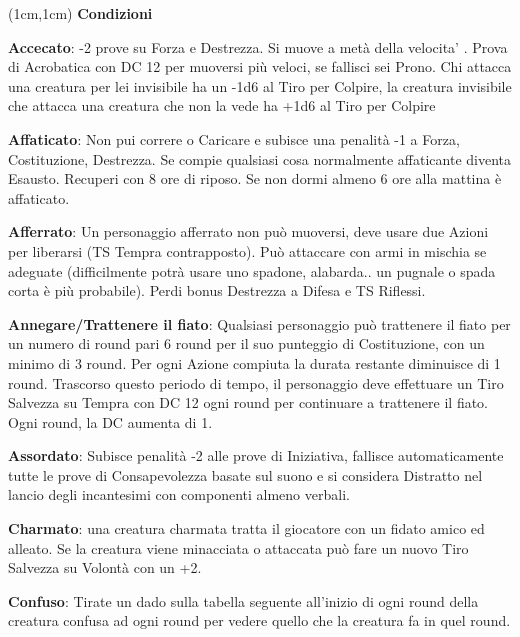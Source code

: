 \documentclass[a4paper,12 pt,openany]{book}
\begin{document}
	\center

	\begin{textblock*}{19 cm}(1cm,1cm) %
		\flushleft
		\textbf{Condizioni}\\
		\footnotesize

		\begin{multicols}{2}

\textbf{Accecato}: -2 prove su Forza e Destrezza.
Si muove a metà della velocita' . Prova di Acrobatica con DC 12 per muoversi più veloci, se fallisci sei Prono.
Chi attacca una creatura per lei invisibile ha un -1d6 al Tiro per Colpire, la creatura invisibile che attacca una creatura che non la vede ha +1d6 al Tiro per Colpire

\textbf{Affaticato}: Non pui correre o Caricare e subisce una penalità -1 a Forza, Costituzione, Destrezza. Se compie qualsiasi cosa normalmente affaticante diventa Esausto.
Recuperi con 8 ore di riposo. Se non dormi almeno 6 ore alla mattina è affaticato.

\textbf{Afferrato}: Un personaggio afferrato non può muoversi, deve usare due Azioni per liberarsi (TS Tempra contrapposto). Può attaccare con armi in mischia se adeguate (difficilmente potrà usare uno spadone, alabarda.. un pugnale o spada corta è più probabile). Perdi bonus Destrezza a Difesa e TS Riflessi.

\textbf{Annegare/Trattenere il fiato}:  Qualsiasi personaggio può trattenere il fiato per un numero di round pari 6 round per il suo punteggio di Costituzione, con un minimo di 3 round. Per ogni Azione compiuta la durata restante diminuisce di 1 round. Trascorso questo periodo di tempo, il personaggio deve effettuare un Tiro Salvezza su Tempra con DC 12 ogni round per continuare a trattenere il fiato. Ogni round, la DC aumenta di 1.

\textbf{Assordato}: Subisce penalità -2 alle prove di Iniziativa, fallisce automaticamente tutte le prove di Consapevolezza basate sul suono e si considera Distratto nel lancio degli incantesimi con componenti almeno verbali.

\textbf{Charmato}: una creatura charmata tratta il giocatore con un fidato amico ed alleato. Se la creatura viene minacciata o attaccata può fare un nuovo Tiro Salvezza su Volontà con un +2.

\textbf{Confuso}:  Tirate un dado sulla tabella seguente all'inizio di ogni round della creatura confusa ad ogni round per vedere quello che la creatura fa in quel round.


\end{multicols}
\end{textblock*}
\end{document}
